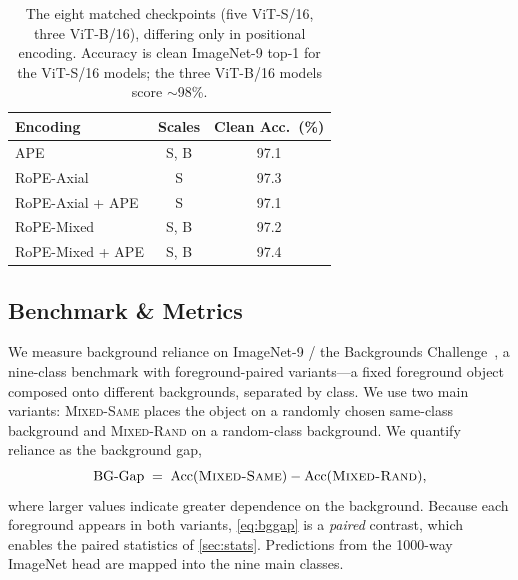 \documentclass[10pt,twocolumn,letterpaper]{article}
\begin{document}
\begin{table}[t]
  \centering\small
  \begin{tabular}{@{}lcc@{}}
    \toprule
    Encoding & Scales & Clean Acc.\ (\%) \\
    \midrule
    APE              & S, B & 97.1 \\
    RoPE-Axial       & S    & 97.3 \\
    RoPE-Axial + APE & S    & 97.1 \\
    RoPE-Mixed       & S, B & 97.2 \\
    RoPE-Mixed + APE & S, B & 97.4 \\
    \bottomrule
  \end{tabular}
  \caption{The eight matched checkpoints (five ViT-S/16, three ViT-B/16), differing only in positional encoding. Accuracy is clean ImageNet-9 top-1 for the ViT-S/16 models; the three ViT-B/16 models score $\sim$98\%.}
  \label{tab:models}
\end{table}

\subsection{Benchmark \& Metrics}
\label{sec:metric}
We measure background reliance on ImageNet-9 / the Backgrounds Challenge~\cite{xiao2021}, a nine-class benchmark with foreground-paired variants---a fixed foreground object composed onto different backgrounds, separated by class. We use two main variants: \textsc{Mixed-Same} places the object on a randomly chosen same-class background and \textsc{Mixed-Rand} on a random-class background. We quantify reliance as the background gap,
%
\begin{equation}
  \mathrm{BG\text{-}Gap} \;=\; \mathrm{Acc}(\textsc{Mixed-Same}) - \mathrm{Acc}(\textsc{Mixed-Rand}),
  \label{eq:bggap}
\end{equation}
%
where larger values indicate greater dependence on the background. Because each foreground appears in both variants, \cref{eq:bggap} is a \emph{paired} contrast, which enables the paired statistics of \cref{sec:stats}. Predictions from the 1000-way ImageNet head are mapped into the nine main classes.
\end{document}
